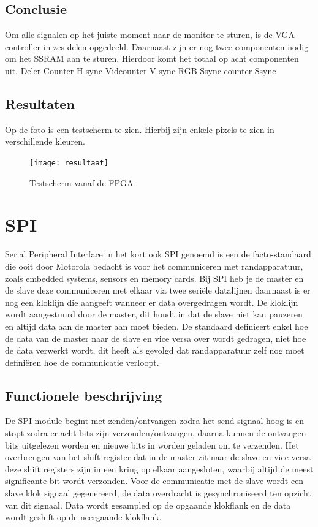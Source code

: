 \documentclass[oneside,dutch]{tudelft-report}
\begin{document}
\section{Conclusie}
Om alle signalen op het juiste moment naar de monitor te sturen, is de VGA-controller in zes delen opgedeeld. Daarnaast zijn er nog twee componenten nodig om het SSRAM aan te sturen. Hierdoor komt het totaal op acht componenten uit. 
Deler
Counter
H-sync
Vidcounter
V-sync
RGB
Ssync-counter
Ssync

\section{Resultaten}
Op de foto is een testscherm te zien. Hierbij zijn enkele pixels te zien in verschillende kleuren.

\begin{figure}[H]
\center
\texttt{[image: resultaat]}
\caption{Testscherm vanaf de FPGA}
\label{VGA}
\end{figure}

\chapter{SPI}
Serial Peripheral Interface in het kort ook SPI genoemd is een de facto-standaard die ooit door Motorola bedacht is voor het communiceren met randapparatuur, zoals embedded systems, sensors en memory cards. Bij SPI heb je de master en de slave deze communiceren met elkaar via twee seriële datalijnen daarnaast is er nog een kloklijn die aangeeft wanneer er data overgedragen wordt. De kloklijn wordt aangestuurd door de master, dit houdt in dat de slave niet kan pauzeren en altijd data aan de master aan moet bieden. De standaard definieert enkel hoe de data van de master naar de slave en vice versa over wordt gedragen, niet hoe de data verwerkt wordt, dit heeft als gevolgd dat randapparatuur zelf nog moet definiëren hoe de communicatie verloopt.

\section{Functionele beschrijving}
De SPI module begint met zenden/ontvangen zodra het send signaal hoog is en stopt zodra er acht bits zijn verzonden/ontvangen, daarna kunnen de ontvangen bits uitgelezen worden en nieuwe bits in worden geladen om te verzenden. Het overbrengen van het shift register dat in de master zit naar de slave en vice versa deze shift registers zijn in een kring op elkaar aangesloten, waarbij altijd de meest significante bit wordt verzonden. Voor de communicatie met de slave wordt een slave klok signaal gegenereerd, de data overdracht is gesynchroniseerd ten opzicht van dit signaal. Data wordt gesampled op de opgaande klokflank en de data wordt geshift op de neergaande klokflank.
\end{document}
